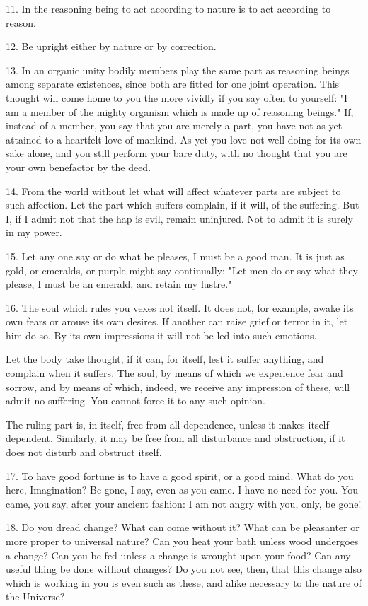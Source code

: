 \documentclass{book}
\begin{document}
11. In the reasoning being to act according to nature is to act
according to reason.

12. Be upright either by nature or by correction.

13. In an organic unity bodily members play the same part as reasoning
beings among separate existences, since both are fitted for one joint
operation. This thought will come home to you the more vividly if you
say often to yourself: "I am a member of the mighty organism which is
made up of reasoning beings." If, instead of a member, you say that
you are merely a part, you have not as yet attained to a heartfelt
love of mankind. As yet you love not well-doing for its own sake
alone, and you still perform your bare duty, with no thought that you
are your own benefactor by the deed.

14. From the world without let what will affect whatever parts are
subject to such affection. Let the part which suffers complain, if it
will, of the suffering. But I, if I admit not that the hap is evil,
remain uninjured. Not to admit it is surely in my power.

\newpage

15. Let any one say or do what he pleases, I must be a good man. It is
just as gold, or emeralds, or purple might say continually: "Let men
do or say what they please, I must be an emerald, and retain my
lustre."

16. The soul which rules you vexes not itself. It does not, for
example, awake its own fears or arouse its own desires. If another can
raise grief or terror in it, let him do so. By its own impressions it
will not be led into such emotions.

Let the body take thought, if it can, for itself, lest it suffer
anything, and complain when it suffers. The soul, by means of which we
experience fear and sorrow, and by means of which, indeed, we receive
any impression of these, will admit no suffering. You cannot force it
to any such opinion.

The ruling part is, in itself, free from all dependence, unless it
makes itself dependent. Similarly, it may be free from all disturbance
and obstruction, if it does not disturb and obstruct itself.

17. To have good fortune is to have a good spirit, or a good
mind. What do you here, Imagination? Be gone, I say, even as you
came. I have no need for you. You came, you say, after your ancient
fashion: I am not angry with you, only, be gone!

18. Do you dread change? What can come without it? What can be pleasanter
or more proper to universal nature? Can you heat your bath unless wood
undergoes a change? Can you be fed unless a change is wrought upon
your food? Can any useful thing be done without changes? Do you not
see, then, that this change also which is working in you is even such
as these, and alike necessary to the nature of the Universe?
\end{document}
